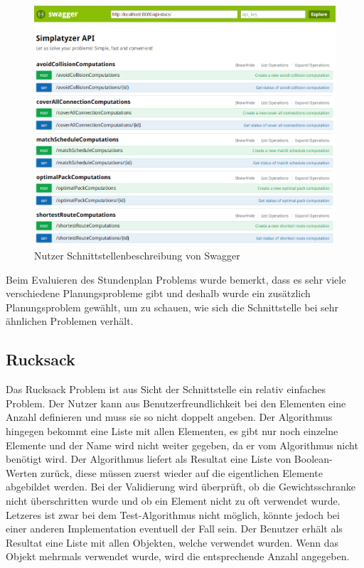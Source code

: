 \begin{figure}[h]
\centering
\includegraphics[scale=0.5]{images/swagger_api.png}
\caption[Nutzer Schnittstellenbeschreibung von Swagger]{Nutzer Schnittstellenbeschreibung von Swagger \selfmade{}}
\label{fig:swagger}
\end{figure}

\FloatBarrier

Beim Evaluieren des Stundenplan Problems wurde bemerkt, dass es sehr viele verschiedene Planungsprobleme gibt und deshalb wurde ein zusätzlich Planungsproblem gewählt, 
um zu schauen, wie sich die Schnittstelle bei sehr ähnlichen Problemen verhält.

%
%
%
%

\subsection{Rucksack}
Das Rucksack Problem ist aus Sicht der Schnittstelle ein relativ einfaches Problem. Der Nutzer kann aus Benutzerfreundlichkeit bei den Elementen eine Anzahl definieren und muss sie so nicht 
doppelt angeben. Der Algorithmus hingegen bekommt eine Liste mit allen Elementen, es gibt nur noch einzelne Elemente und der Name wird nicht weiter gegeben, da er vom Algorithmus nicht 
benötigt wird. Der Algorithmus liefert als Resultat eine Liste von Boolean-Werten zurück, diese müssen zuerst wieder auf die eigentlichen Elemente abgebildet werden. Bei der Validierung wird 
überprüft, ob die Gewichtsschranke nicht überschritten wurde und ob ein Element nicht zu oft verwendet wurde. Letzeres ist zwar bei dem Test-Algorithmus nicht möglich, könnte jedoch bei 
einer anderen Implementation eventuell der Fall sein. Der Benutzer erhält als Resultat eine Liste mit allen Objekten, welche verwendet wurden. Wenn das Objekt mehrmals verwendet wurde, 
wird die entsprechende Anzahl angegeben.

